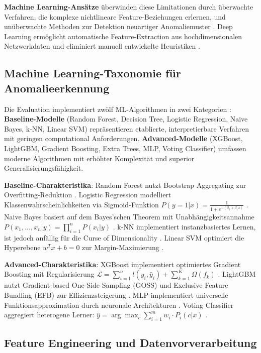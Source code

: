 \documentclass[11pt,a4paper]{article}
\begin{document}
    \textbf{Machine Learning-Ansätze} überwinden diese Limitationen durch überwachte Verfahren, die komplexe nichtlineare Feature-Beziehungen erlernen, und unüberwachte Methoden zur Detektion neuartiger Anomaliemuster \parencite{Vinayakumar2019}. Deep Learning ermöglicht automatische Feature-Extraction aus hochdimensionalen Netzwerkdaten und eliminiert manuell entwickelte Heuristiken \parencite{Goodfellow2016}.

    \subsection{Machine Learning-Taxonomie für Anomalieerkennung}

    Die Evaluation implementiert zwölf ML-Algorithmen in zwei Kategorien \parencite{Vinayakumar2019}: \textbf{Baseline-Modelle} (Random Forest, Decision Tree, Logistic Regression, Naive Bayes, k-NN, Linear SVM) repräsentieren etablierte, interpretierbare Verfahren mit geringen computational Anforderungen. \textbf{Advanced-Modelle} (XGBoost, LightGBM, Gradient Boosting, Extra Trees, MLP, Voting Classifier) umfassen moderne Algorithmen mit erhöhter Komplexität und superior Generalisierungsfähigkeit.

    \textbf{Baseline-Charakteristika}: Random Forest nutzt Bootstrap Aggregating zur Overfitting-Reduktion \parencite{Hastie2009}. Logistic Regression modelliert Klassenwahrscheinlichkeiten via Sigmoid-Funktion $P(y=1|x) = \frac{1}{1+e^{-(\beta_0 + \beta_1 x)}}$ \parencite{Bishop2006}. Naive Bayes basiert auf dem Bayes'schen Theorem mit Unabhängigkeitsannahme $P(x_1,...,x_n|y) = \prod_{i=1}^{n} P(x_i|y)$ \parencite{Bishop2006}. k-NN implementiert instanzbasiertes Lernen, ist jedoch anfällig für die Curse of Dimensionality \parencite{Hastie2009}. Linear SVM optimiert die Hyperebene $w^T x + b = 0$ zur Margin-Maximierung \parencite{Platt1999}.

    \textbf{Advanced-Charakteristika}: XGBoost implementiert optimiertes Gradient Boosting mit Regularisierung $\mathcal{L} = \sum_{i=1}^{n} l(y_i, \hat{y}_i) + \sum_{k=1}^{K} \Omega(f_k)$ \parencite{Hastie2009}. LightGBM nutzt Gradient-based One-Side Sampling (GOSS) und Exclusive Feature Bundling (EFB) zur Effizienzsteigerung \parencite{Zhou2020}. MLP implementiert universelle Funktionsapproximation durch neuronale Architekturen \parencite{Goodfellow2016}. Voting Classifier aggregiert heterogene Lerner: $\hat{y} = \arg\max_c \sum_{i=1}^{m} w_i \cdot P_i(c|x)$ \parencite{Hastie2009}.

    \subsection{Feature Engineering und Datenvorverarbeitung}
\end{document}
